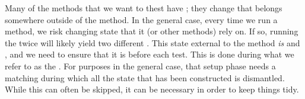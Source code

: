 Many of the methods that we want to thest have ; they change  that belongs somewhere outside of the method. In the general case, every time we run a method, we risk changing state that it (or other methods) rely on. If so, running the  twice will likely yield two different . This state external to the method \textsl{is} and , and we need to ensure that it is  before each test. This is done during what we refer to as the . For  purposes in the general case, that setup phase needs a matching  during which all the state that has been constructed is dismantled. While this can often be skipped, it can be necessary in order to keep things tidy.

